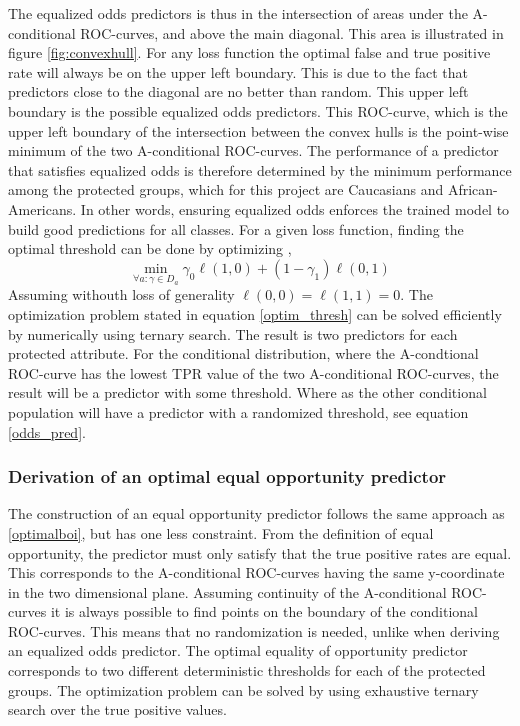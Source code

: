 \documentclass[11pt, fleqn, titlepage]{article}
\begin{document}
	The equalized odds predictors is thus in the intersection of areas under the A-conditional ROC-curves, and above the main diagonal. This area is illustrated in figure \ref{fig:convexhull}. For any loss function the optimal false and true positive rate will always be on the upper left boundary. This is due to the fact that predictors close to the diagonal are no better than random. This upper left boundary is the possible equalized odds predictors. This ROC-curve, which is the upper left boundary of the intersection between the convex hulls is the point-wise minimum of the two A-conditional ROC-curves. The performance of a predictor that satisfies equalized odds is therefore determined by the minimum performance among the protected groups, which for this project are Caucasians and African-Americans. In other words, ensuring equalized odds enforces the trained model to build good predictions for all classes. For a given loss function, finding the optimal threshold can be done by optimizing ,
	\begin{equation}\label{optim_thresh}
	\min _{\forall a: \gamma \in D_{a}} \gamma_{0} \ell(1,0)+\left(1-\gamma_{1}\right) \ell(0,1)
	\end{equation}
	Assuming withouth loss of generality $ \ell (0,0) = \ell(1,1)=0 $.
	The optimization problem stated in equation \ref{optim_thresh} can be solved efficiently by numerically using ternary search. The result is two predictors for each protected attribute. For the conditional distribution, where the A-condtional ROC-curve has the lowest TPR value of the two A-conditional ROC-curves, the result will be a predictor with some threshold. Where as the other conditional population will have a predictor with a randomized threshold, see equation \ref{odds_pred}. \cite{equal_of_oppor}
	\subsubsection{Derivation of an optimal equal opportunity predictor}\label{optimalboi equal_oppor}
	
	The construction of an equal opportunity predictor follows the same approach as \ref{optimalboi}, but has one less constraint. From the definition of equal opportunity, the predictor must only satisfy that the true positive rates are equal. This corresponds to the A-conditional ROC-curves having the same y-coordinate in the two dimensional plane. Assuming continuity of the A-conditional ROC-curves it is always possible to find points on the boundary of the conditional ROC-curves. This means that no randomization is needed, unlike when deriving an equalized odds predictor. The optimal equality of opportunity predictor corresponds to two different deterministic thresholds for each of the protected groups. The optimization problem can be solved by using exhaustive ternary search over the true positive values. \cite{equal_of_oppor} %
	
\end{document}
